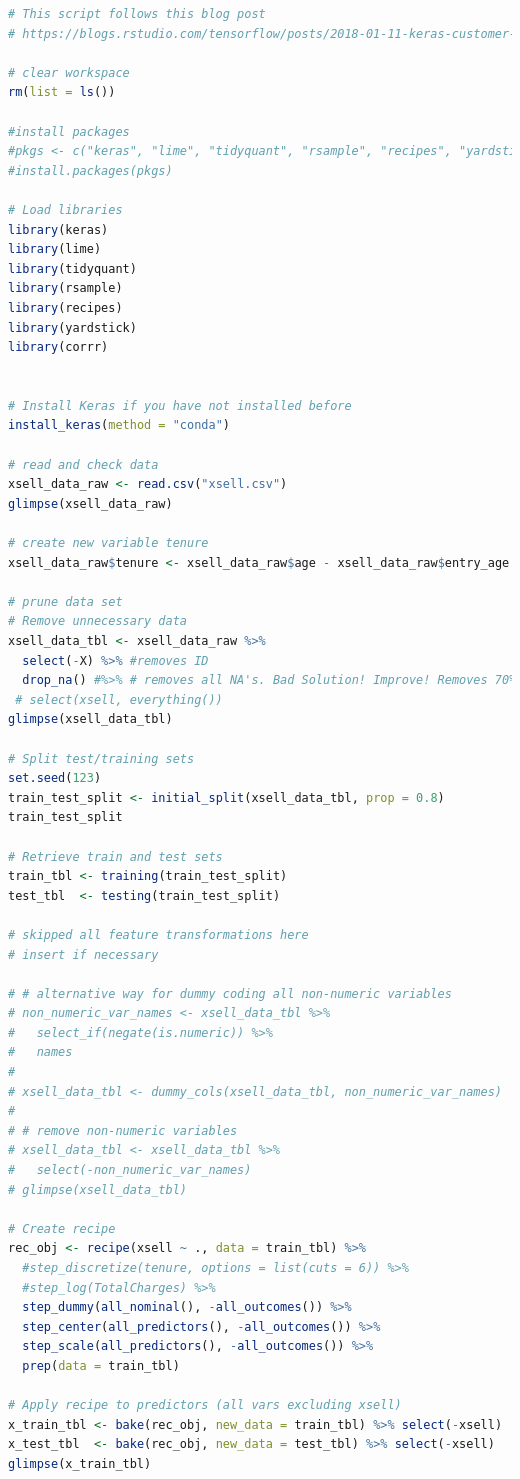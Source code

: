 \begin{lstlisting}[language=R,caption={Tensorflow Model}, label=lst:tensorflow]
# This script follows this blog post
# https://blogs.rstudio.com/tensorflow/posts/2018-01-11-keras-customer-churn/

# clear workspace
rm(list = ls())

#install packages
#pkgs <- c("keras", "lime", "tidyquant", "rsample", "recipes", "yardstick", "corrr")
#install.packages(pkgs)

# Load libraries
library(keras)
library(lime)
library(tidyquant)
library(rsample)
library(recipes)
library(yardstick)
library(corrr)


# Install Keras if you have not installed before
install_keras(method = "conda")

# read and check data
xsell_data_raw <- read.csv("xsell.csv")
glimpse(xsell_data_raw)

# create new variable tenure
xsell_data_raw$tenure <- xsell_data_raw$age - xsell_data_raw$entry_age

# prune data set
# Remove unnecessary data
xsell_data_tbl <- xsell_data_raw %>%
  select(-X) %>% #removes ID
  drop_na() #%>% # removes all NA's. Bad Solution! Improve! Removes 70% of observations
 # select(xsell, everything())
glimpse(xsell_data_tbl)

# Split test/training sets
set.seed(123)
train_test_split <- initial_split(xsell_data_tbl, prop = 0.8)
train_test_split

# Retrieve train and test sets
train_tbl <- training(train_test_split)
test_tbl  <- testing(train_test_split)

# skipped all feature transformations here
# insert if necessary

# # alternative way for dummy coding all non-numeric variables
# non_numeric_var_names <- xsell_data_tbl %>%
#   select_if(negate(is.numeric)) %>%
#   names
# 
# xsell_data_tbl <- dummy_cols(xsell_data_tbl, non_numeric_var_names)
# 
# # remove non-numeric variables
# xsell_data_tbl <- xsell_data_tbl %>%
#   select(-non_numeric_var_names)
# glimpse(xsell_data_tbl)

# Create recipe
rec_obj <- recipe(xsell ~ ., data = train_tbl) %>%
  #step_discretize(tenure, options = list(cuts = 6)) %>%
  #step_log(TotalCharges) %>%
  step_dummy(all_nominal(), -all_outcomes()) %>%
  step_center(all_predictors(), -all_outcomes()) %>%
  step_scale(all_predictors(), -all_outcomes()) %>%
  prep(data = train_tbl)

# Apply recipe to predictors (all vars excluding xsell)
x_train_tbl <- bake(rec_obj, new_data = train_tbl) %>% select(-xsell)
x_test_tbl  <- bake(rec_obj, new_data = test_tbl) %>% select(-xsell)
glimpse(x_train_tbl)


\end{lstlisting}
